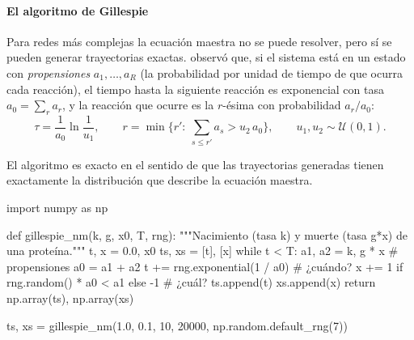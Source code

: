 \paragraph{El algoritmo de Gillespie} Para redes más complejas la ecuación maestra no se puede resolver, pero sí se pueden generar trayectorias exactas. \textcite{c16-gillespie1977} observó que, si el sistema está en un estado con \emph{propensiones} $a_1,\dots,a_R$ (la probabilidad por unidad de tiempo de que ocurra cada reacción), el tiempo hasta la siguiente reacción es exponencial con tasa $a_0=\sum_r a_r$, y la reacción que ocurre es la $r$-ésima con probabilidad $a_r/a_0$:
\begin{equation}\label{eq:16-gillespie}
\tau=\frac{1}{a_0}\ln\frac{1}{u_1},\qquad
r=\min\Big\{r':\ \sum_{s\le r'}a_s> u_2\,a_0\Big\},\qquad u_1,u_2\sim\mathcal{U}(0,1).
\end{equation}
\begin{simbolos}
\end{simbolos}
El algoritmo es exacto en el sentido de que las trayectorias generadas tienen exactamente la distribución que describe la ecuación maestra.

\begin{codigo}[gillespie.py]
import numpy as np

def gillespie_nm(k, g, x0, T, rng):
    """Nacimiento (tasa k) y muerte (tasa g*x) de una proteína."""
    t, x = 0.0, x0
    ts, xs = [t], [x]
    while t < T:
        a1, a2 = k, g * x                  # propensiones
        a0 = a1 + a2
        t += rng.exponential(1 / a0)       # ¿cuándo?
        x += 1 if rng.random() * a0 < a1 else -1   # ¿cuál?
        ts.append(t)
        xs.append(x)
    return np.array(ts), np.array(xs)

ts, xs = gillespie_nm(1.0, 0.1, 10, 20000, np.random.default_rng(7))
\end{codigo}


